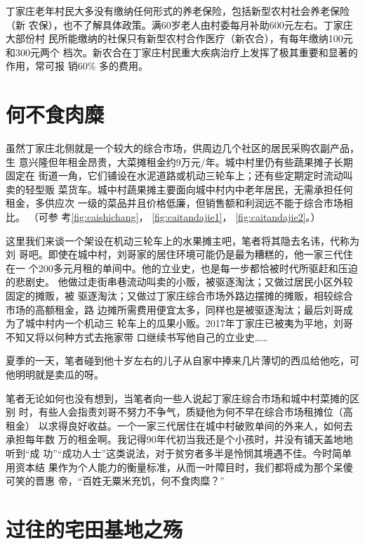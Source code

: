   丁家庄老年村民大多没有缴纳任何形式的养老保险，包括新型农村社会养老保险（新
  农保），也不了解具体政策。满60岁老人由村委每月补助600元左右。丁家庄大部份村
  民所能缴纳的社保只有新型农村合作医疗（新农合），有每年缴纳100元和300元两个
  档次。新农合在丁家庄村民重大疾病治疗上发挥了极其重要和显著的作用，常可报
  销60\% 多的费用。

  \section{何不食肉糜}

  虽然丁家庄北侧就是一个较大的综合市场，供周边几个社区的居民采购农副产品，生
  意兴隆但年租金昂贵，大菜摊租金约9万元/年。城中村里仍有些蔬果摊子长期固定在
  街道一角，它们铺设在水泥道路或机动三轮车上；还有些定期定时流动叫卖的轻型贩
  菜货车。城中村蔬果摊主要面向城中村内中老年居民，无需承担任何租金，多供应次
  一级的菜品并且价格低廉，但销售额和利润远不能于综合市场相比。 （可参
  考\cref{fig:caishichang}， \cref{fig:caitandajie1}，
  \cref{fig:caitandajie2}。）

  这里我们来谈一个架设在机动三轮车上的水果摊主吧，笔者将其隐去名讳，代称为刘
  哥吧。即使在城中村，刘哥家的居住环境可能仍是最为糟糕的，他一家三代住在一
  个200多元月租的单间中。他的立业史，也是每一步都恰被时代所驱赶和压迫的悲剧史。
  他做过走街串巷流动叫卖的小贩，被驱逐淘汰；又做过居民小区外较固定的摊贩，被
  驱逐淘汰；又做过丁家庄综合市场外路边摆摊的摊贩，相较综合市场的高额租金，路
  边摊所需费用便宜太多，同样也是被驱逐淘汰；最后刘哥成为了城中村内一个机动三
  轮车上的瓜果小贩。2017年丁家庄已被夷为平地，刘哥不知又将以何种方式去拖家带
  口继续书写他自己的立业史……

  夏季的一天，笔者碰到他十岁左右的儿子从自家中捧来几片薄切的西瓜给他吃，可
  他明明就是卖瓜的呀。

  笔者无论如何也没有想到，当笔者向一些人说起丁家庄综合市场和城中村菜摊的区别
  时，有些人会指责刘哥不努力不争气，质疑他为何不早在综合市场租摊位（高租金）
  以求得良好收益。一个一家三代居住在城中村破败单间的外来人，如何去承担每年数
  万的租金啊。我记得90年代初当我还是个小孩时，并没有铺天盖地地听到“成
  功”“成功人士”这类说法，对于贫穷者多半是怜悯其境遇不佳。今时简单用资本结
  果作为个人能力的衡量标准，从而一叶障目时，我们都将成为那个呆傻可笑的晋惠
  帝，“百姓无粟米充饥，何不食肉糜？”


  \section{过往的宅田基地之殇}

